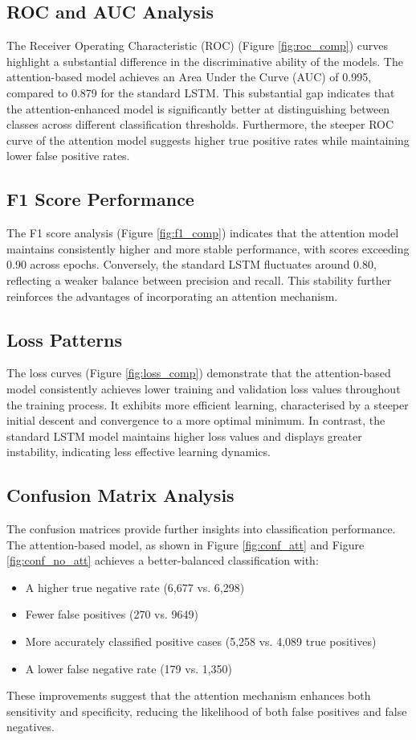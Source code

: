 \documentclass[sn-mathphys-ay, Numbered]{sn-jnl}
\theoremstyle{thmstyleone}%
\theoremstyle{thmstyletwo}%
\theoremstyle{thmstylethree}%
\begin{document}
\subsection{ROC and AUC Analysis}
The Receiver Operating Characteristic (ROC) (Figure \ref{fig:roc_comp}) curves highlight a substantial difference in the discriminative ability of the models. The attention-based model achieves an Area Under the Curve (AUC) of 0.995, compared to 0.879 for the standard LSTM. This substantial gap indicates that the attention-enhanced model is significantly better at distinguishing between classes across different classification thresholds. Furthermore, the steeper ROC curve of the attention model suggests higher true positive rates while maintaining lower false positive rates.

\subsection{F1 Score Performance}
The F1 score analysis (Figure \ref{fig:f1_comp}) indicates that the attention model maintains consistently higher and more stable performance, with scores exceeding 0.90 across epochs. Conversely, the standard LSTM fluctuates around 0.80, reflecting a weaker balance between precision and recall. This stability further reinforces the advantages of incorporating an attention mechanism.

\subsection{Loss Patterns}
The loss curves (Figure \ref{fig:loss_comp}) demonstrate that the attention-based model consistently achieves lower training and validation loss values throughout the training process. It exhibits more efficient learning, characterised by a steeper initial descent and convergence to a more optimal minimum. In contrast, the standard LSTM model maintains higher loss values and displays greater instability, indicating less effective learning dynamics.

\subsection{Confusion Matrix Analysis}
The confusion matrices provide further insights into classification performance. The attention-based model, as shown in Figure  \ref{fig:conf_att} and Figure \ref{fig:conf_no_att} achieves a better-balanced classification with:
\begin{itemize}
	\item A higher true negative rate (6,677 vs. 6,298)
	\item Fewer false positives (270 vs. 9649)
	\item More accurately classified positive cases (5,258 vs. 4,089 true positives)
	\item A lower false negative rate (179 vs. 1,350)
\end{itemize}
These improvements suggest that the attention mechanism enhances both sensitivity and specificity, reducing the likelihood of both false positives and false negatives.
\end{document}
